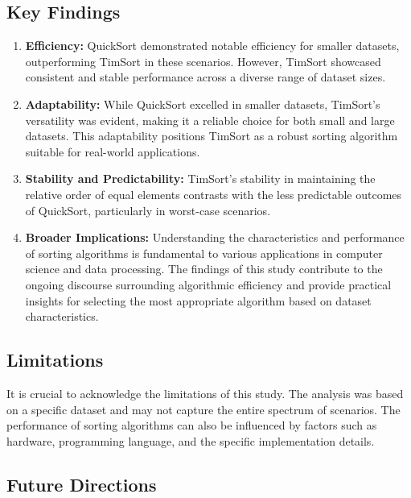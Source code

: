 \documentclass[a4paper, 9pt, twocolumn]{article}
\begin{document}
\subsection*{Key Findings}

\begin{enumerate}
  \item \textbf{Efficiency:} QuickSort demonstrated notable efficiency for smaller datasets, outperforming TimSort in these scenarios. However, TimSort showcased consistent and stable performance across a diverse range of dataset sizes.

  \item \textbf{Adaptability:} While QuickSort excelled in smaller datasets, TimSort's versatility was evident, making it a reliable choice for both small and large datasets. This adaptability positions TimSort as a robust sorting algorithm suitable for real-world applications.

  \item \textbf{Stability and Predictability:} TimSort's stability in maintaining the relative order of equal elements contrasts with the less predictable outcomes of QuickSort, particularly in worst-case scenarios.

  \item \textbf{Broader Implications:} Understanding the characteristics and performance of sorting algorithms is fundamental to various applications in computer science and data processing. The findings of this study contribute to the ongoing discourse surrounding algorithmic efficiency and provide practical insights for selecting the most appropriate algorithm based on dataset characteristics.
\end{enumerate}

\subsection*{Limitations}

It is crucial to acknowledge the limitations of this study. The analysis was based on a specific dataset and may not capture the entire spectrum of scenarios. The performance of sorting algorithms can also be influenced by factors such as hardware, programming language, and the specific implementation details.

\subsection*{Future Directions}
\end{document}
